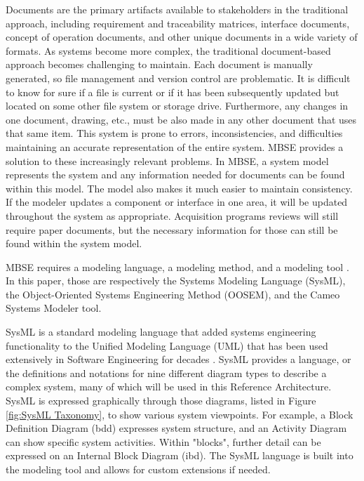 \documentclass[conference]{joss-pretty}
\begin{document}
Documents are the primary artifacts available to stakeholders \citep{Delligatti} in the traditional approach, including requirement and traceability matrices, interface documents, concept of operation documents, and other unique documents in a wide variety of formats. As systems become more complex, the traditional document-based approach becomes challenging to maintain. Each document is manually generated, so file management and version control are problematic. It is difficult to know for sure if a file is current or if it has been subsequently updated but located on some other file system or storage drive. Furthermore, any changes in one document, drawing, etc., must be also made in any other document that uses that same item. This system is prone to errors, inconsistencies, and difficulties maintaining an accurate representation of the entire system. MBSE provides a solution to these increasingly relevant problems. In MBSE, a system model represents the system and any information needed for documents can be found within this model. The model also makes it much easier to maintain consistency. If the modeler updates a component or interface in one area, it will be updated throughout the system as appropriate. Acquisition programs reviews will still require paper documents, but the necessary information for those can still be found within the system model. 

MBSE requires a modeling language, a modeling method, and a modeling tool \citep{Delligatti}. In this paper, those are respectively the Systems Modeling Language (SysML), the Object-Oriented Systems Engineering Method (OOSEM), and the Cameo Systems Modeler tool.

SysML is a standard modeling language that added systems engineering functionality to the Unified Modeling Language (UML) that has been used extensively in Software Engineering for decades \citep{Delligatti}. SysML provides a language, or the definitions and notations for nine different diagram types to describe a complex system, many of which will be used in this Reference Architecture. SysML is expressed graphically through those diagrams, listed in Figure \ref{fig:SysML Taxonomy}, to show various system viewpoints. For example, a Block Definition Diagram (bdd) expresses system structure, and an Activity Diagram can show specific system activities. Within "blocks", further detail can be expressed on an Internal Block Diagram (ibd). The SysML language is built into the modeling tool and allows for custom extensions if needed.
\end{document}
